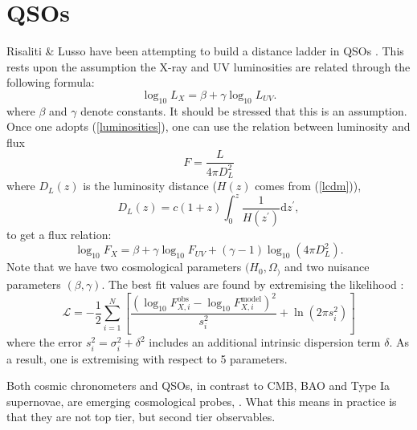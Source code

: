 \documentclass[aps,prl,10pt,twocolumn,superscriptaddress]{revtex4}
\def\be{\begin{equation}}
\def\ee{\end{equation}}
\newcommand{\dd}{\textrm{d}}
\begin{document}
\section{QSOs}
Risaliti \& Lusso have been attempting to build a distance ladder in QSOs \cite{Risaliti:2015zla, Risaliti:2018reu, Lusso:2020pdb}. This rests upon the assumption the X-ray and UV luminosities are related through the following formula: 
\be
\label{luminosities}
\log_{10} L_X = \beta + \gamma \log_{10} L_{UV}. 
\ee
where $\beta$ and $\gamma$ denote constants. It should be stressed that this is an assumption. Once one adopts (\ref{luminosities}), one can use the relation between luminosity and flux 
\be
F = \frac{L}{4 \pi D_{L}^2}
\ee
where $D_{L}(z)$ is the luminosity distance ($H(z)$ comes from (\ref{lcdm})),
\be
D_{L}(z) = c (1+z) \int_0^z \frac{1}{H(z^{\prime})} \dd z^{\prime}, 
\ee
to get a flux relation: 
\be
\log_{10} F_{X} = \beta + \gamma \log_{10} F_{UV} + (\gamma-1) \log_{10} (4 \pi D_{L}^2). 
\label{fluxes}
\ee
Note that we have two cosmological parameters $(H_0, \Omega_)$ and two nuisance parameters $(\beta, \gamma)$. The best fit values are found by extremising the likelihood \cite{Risaliti:2015zla}: 
\be
\label{likelihood}
\mathcal{L} = - \frac{1}{2} \sum_{i=1}^N \left[ \frac{ (\log_{10} F_{X,i}^{\textrm{obs}} - \log_{10} F_{X,i}^{\textrm{model}})^2}{s_i^2} + \ln (2 \pi s_i^2)\right]
\ee
where the error $s_i^2 = \sigma_i^2 + \delta^2$ includes an additional intrinsic dispersion term $\delta$. As a result, one is extremising with respect to 5 parameters. 


Both cosmic chronometers and QSOs, in contrast to CMB, BAO and Type Ia supernovae, are emerging cosmological probes, \cite{Moresco:2022phi}. What this means in practice is that they are not top tier, but second tier observables.  
\end{document}
